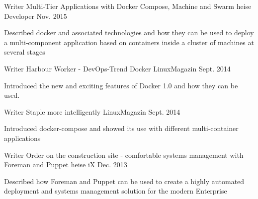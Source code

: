 \clearpage
{}


\begin{cventries}

  \cventry
    {Writer} %
    {Multi-Tier Applications with Docker Compose, Machine and Swarm} %
    {heise Developer} %
    {Nov. 2015} %
    {
      \begin{cvitems} %
        \item {Described docker and associated technologies and how they can be used to deploy a multi-component application based on containers inside a cluster of machines at several stages}
      \end{cvitems}
    }

  \cventry
    {Writer} %
    {Harbour Worker - DevOps-Trend Docker} %
    {LinuxMagazin} %
    {Sept. 2014} %
    {
      \begin{cvitems} %
        \item {Introduced the new and exciting features of Docker 1.0 and how they can be used.}
      \end{cvitems}
    }
  \cventry
    {Writer} %
    {Staple more intelligently} %
    {LinuxMagazin} %
    {Sept. 2014} %
    {
      \begin{cvitems} %
        \item {Introduced docker-compose and showed its use with different multi-container applications}
      \end{cvitems}
    }
  \cventry
    {Writer} %
    {Order on the construction site - comfortable systems management with Foreman and Puppet} %
    {heise iX} %
    {Dec. 2013} %
    {
      \begin{cvitems} %
        \item {Described how Foreman and Puppet can be used to create a highly automated deployment and systems management solution for the modern Enterprise}
      \end{cvitems}
    }

\end{cventries}
